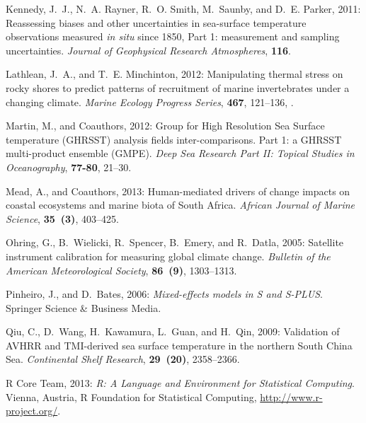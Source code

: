 \documentclass[twocol]{ametsoc}
\begin{document}
\begin{thebibliography}{41}
Kennedy, J.~J., N.~A. Rayner, R.~O. Smith, M.~Saunby, and D.~E. Parker, 2011:
  {Reassessing biases and other uncertainties in sea-surface temperature
  observations measured \emph{in situ} since 1850, Part 1: measurement and
  sampling uncertainties}. \textit{Journal of Geophysical Research
  Atmospheres}, \textbf{116}.

Lathlean, J.~A., and T.~E. Minchinton, 2012: {Manipulating thermal stress on
  rocky shores to predict patterns of recruitment of marine invertebrates under
  a changing climate}. \textit{Marine Ecology Progress Series}, \textbf{467},
  121--136, .

Martin, M., and Coauthors, 2012: {Group for High Resolution Sea Surface
  temperature (GHRSST) analysis fields inter-comparisons. Part 1: a GHRSST
  multi-product ensemble (GMPE)}. \textit{Deep Sea Research Part II: Topical
  Studies in Oceanography}, \textbf{77-80}, 21--30.

Mead, A., and Coauthors, 2013: {Human-mediated drivers of change {\textemdash}
  impacts on coastal ecosystems and marine biota of South Africa}.
  \textit{African Journal of Marine Science}, \textbf{35~(3)}, 403--425.

Ohring, G., B.~Wielicki, R.~Spencer, B.~Emery, and R.~Datla, 2005: {Satellite
  instrument calibration for measuring global climate change}. \textit{Bulletin of the American Meteorological Society},
  \textbf{86~(9)}, 1303--1313.

Pinheiro, J., and D.~Bates, 2006: \textit{Mixed-effects models in S and
  S-PLUS}. Springer Science \& Business Media.

Qiu, C., D.~Wang, H.~Kawamura, L.~Guan, and H.~Qin, 2009: {Validation of AVHRR
  and TMI-derived sea surface temperature in the northern South China Sea}.
  \textit{Continental Shelf Research}, \textbf{29~(20)}, 2358--2366.

{R Core Team}, 2013: \textit{{R: A Language and Environment for Statistical
  Computing}}. Vienna, Austria, R Foundation for Statistical Computing,
  \urlprefix\url{http://www.r-project.org/}.


\end{thebibliography}
\end{document}
